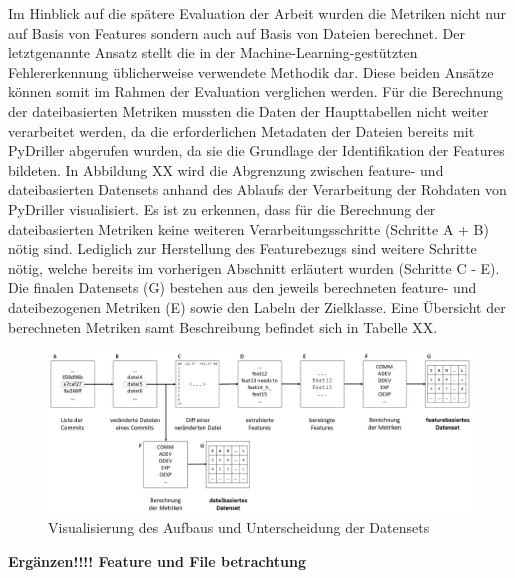 Im Hinblick auf die spätere Evaluation der Arbeit wurden die Metriken nicht nur auf Basis von Features sondern auch auf Basis von Dateien berechnet. Der letztgenannte Ansatz stellt die in der Machine-Learning-gestützten Fehlererkennung üblicherweise verwendete Methodik dar. Diese beiden Ansätze können somit im Rahmen der Evaluation verglichen werden. Für die Berechnung der dateibasierten Metriken mussten die Daten der Haupttabellen nicht weiter verarbeitet werden, da die erforderlichen Metadaten der Dateien bereits mit PyDriller abgerufen wurden, da sie die Grundlage der Identifikation der Features bildeten. In Abbildung XX wird die Abgrenzung zwischen feature- und dateibasierten Datensets anhand des Ablaufs der Verarbeitung der Rohdaten von PyDriller visualisiert. Es ist zu erkennen, dass für die Berechnung der dateibasierten Metriken keine weiteren Verarbeitungsschritte (Schritte A + B) nötig sind. Lediglich zur Herstellung des Featurebezugs sind weitere Schritte nötig, welche bereits im vorherigen Abschnitt erläutert wurden (Schritte C - E). Die finalen Datensets (G) bestehen aus den jeweils berechneten feature- und dateibezogenen Metriken (E) sowie den Labeln der Zielklasse. Eine Übersicht der berechneten Metriken samt Beschreibung befindet sich in Tabelle XX.

\begin{figure}[]
    \centering
    \includegraphics[width=\textwidth]{images/Dataset}
    \caption{Visualisierung des Aufbaus und Unterscheidung der Datensets\label{fig:dataset}}
\end{figure}

\textbf{Ergänzen!!!! Feature und File betrachtung}

